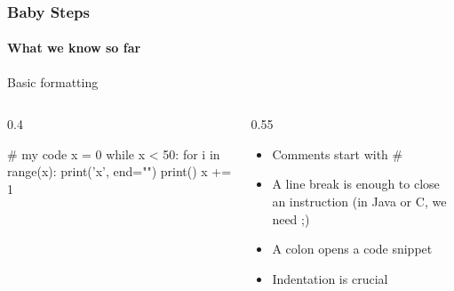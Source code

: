 \documentclass[xcolor=x11names,handout]{beamer}
\begin{document}
\begin{frame}[fragile]
\frametitle{Baby Steps}
\framesubtitle{What we know so far}

\alert{Basic formatting}

\begin{columns}
\begin{column}{0.4\textwidth}
\begin{python}
# my code
x = 0
while x < 50:
	for i in range(x):
		print('x', end="")
	print()
	x += 1
\end{python}
\end{column}

\begin{column}{0.55\textwidth}
\begin{itemize}
\item Comments start with \alert{\#}
\item A \alert{line break} is enough to close an instruction (in Java or C, we
need \alert{;})
\item A \alert{colon} opens a code snippet
\item \alert{Indentation is crucial}
\end{itemize}
\end{column}
\end{columns}
\end{frame}
\end{document}

